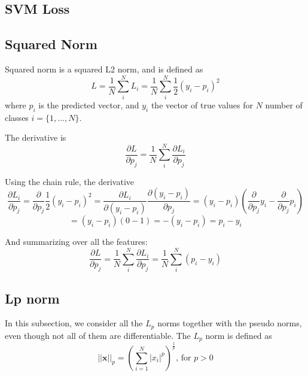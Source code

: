 \documentclass{article}
\begin{document}
\subsection{SVM Loss}


\subsection{Squared Norm}
Squared norm is a squared L2 norm, and is defined as
\begin{equation}
    \label{15}
    L = \frac{1}{N} \sum_{i}^{N} L_i = \frac{1}{N} \sum_{i}^{N} \frac{1}{2} (y_i - p_i)^2
\end{equation}
where $p_i$ is the predicted vector, and $y_i$ the vector of true values for $N$ number of classes $i = \{1, ..., N\} $.

The derivative is
\begin{equation}
    \label{16}
    \frac{\partial{L}}{\partial{p_j}} = \frac{1}{N} \sum_{i}^{N} \frac{\partial{L_i}}{\partial{p_j}}
\end{equation}

Using the chain rule, the derivative
\begin{equation}
    \label{17}
\frac{\partial{L_i}}{\partial{p_j}} = \frac{\partial}{\partial{p_j}} \frac{1}{2} (y_i - p_i)^2 = \frac{\partial{L_i}}{\partial{(y_i - p_i)}} \frac{\partial{(y_i - p_i)}}{\partial{p_j}} = (y_i - p_i) (\frac{\partial}{\partial{p_j}} y_i - \frac{\partial}{\partial{p_j}} p_i)
\end{equation}
\begin{equation}
    \label{18}
= (y_i - p_i)(0-1) = -(y_i - p_i) = p_i-y_i
\end{equation}

And summarizing over all the features:
\begin{equation}
    \label{19}
     \frac{\partial{L}}{\partial{p_j}} = \frac{1}{N} \sum_{i}^{N} \frac{\partial{L_i}}{\partial{p_j}}=\frac{1}{N}  \sum_{i}^{N} (p_i-y_i)
\end{equation}



\subsection{Lp norm}
In this subsection, we consider all the $L_p$ norms together with the pseudo norms, even though not all of them are differentiable.
The $L_p$ norm is defined as
\begin{equation}
     \label{20}
    || \mathbf{x} ||_p = ( \sum_{i=1}^{N} |x_i|^p)^{\frac{1}{p}}  \text{, for } p > 0
\end{equation}
\end{document}
